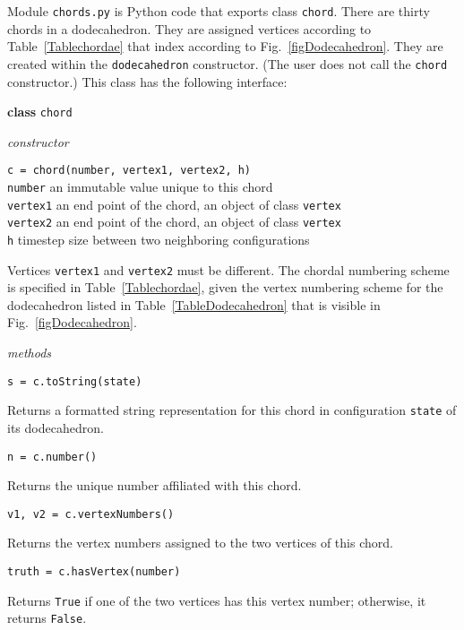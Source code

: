 \label{appchords}

Module \texttt{chords.py} is Python code that exports class \texttt{chord}.  There are thirty chords in a dodecahedron.  They are assigned vertices according to Table~\ref{Tablechordae} that index according to Fig.~\ref{figDodecahedron}.  They are created within the \texttt{dodecahedron} constructor.  (The user does not call the \texttt{chord} constructor.)  This class has the following interface:

\bigskip\noindent
\textbf{class} \texttt{chord}

\medskip\noindent
\textit{constructor}

\medskip\noindent
\texttt{c = chord(number, vertex1, vertex2, h)} \\
\indent \texttt{number\phantom{1}} \; an immutable value unique to this chord \\
\indent \texttt{vertex1} \; an end point of the chord, an object of class \texttt{vertex} \\
\indent \texttt{vertex2} \; an end point of the chord, an object of class \texttt{vertex} \\
\indent \texttt{h} \qquad\quad\;\; timestep size between two neighboring configurations

\medskip\noindent
Vertices \texttt{vertex1} and \texttt{vertex2} must be different.  The chordal numbering scheme is specified in Table~\ref{Tablechordae}, given the vertex numbering scheme for the dodecahedron listed in Table~\ref{TableDodecahedron} that is visible in Fig.~\ref{figDodecahedron}.

\medskip\noindent
\textit{methods}

\medskip\noindent
\texttt{s = c.toString(state)}

\medskip\noindent
Returns a formatted string representation for this chord in configuration \texttt{state} of its dodecahedron.

\medskip\noindent
\texttt{n = c.number()}

\medskip\noindent
Returns the unique number affiliated with this chord.

\medskip\noindent
\texttt{v1, v2 = c.vertexNumbers()}

\medskip\noindent
Returns the vertex numbers assigned to the two vertices of this chord.

\medskip\noindent
\texttt{truth = c.hasVertex(number)}

\medskip\noindent
Returns \texttt{True} if one of the two vertices has this vertex number; otherwise, it returns \texttt{False}.

